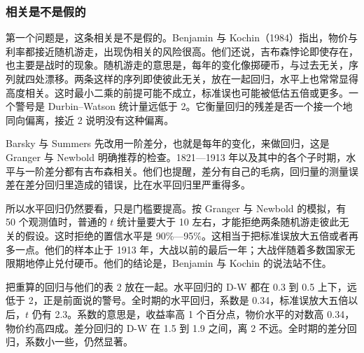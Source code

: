 
\subsubsection{相关是不是假的}
第一个问题是，这条相关是不是假的。Benjamin 与 Kochin（1984）指出，物价与利率都接近随机游走，出现伪相关的风险很高\cite{barsky1985}。他们还说，吉布森悖论即使存在，也主要是战时的现象\cite{barsky1985}。随机游走的意思是，每年的变化像掷硬币，与过去无关，序列就四处漂移。两条这样的序列即使彼此无关，放在一起回归，水平上也常常显得高度相关。这时最小二乘的前提可能不成立，标准误也可能被低估五倍或更多\cite{barsky1985}。一个警号是 Durbin–Watson 统计量远低于 2。它衡量回归的残差是否一个接一个地同向偏离，接近 2 说明没有这种偏离。

Barsky 与 Summers 先改用一阶差分，也就是每年的变化，来做回归，这是 Granger 与 Newbold 明确推荐的检查\cite{barsky1985}。1821—1913 年以及其中的各个子时期，水平与一阶差分都有吉布森相关\cite{barsky1985}。他们也提醒，差分有自己的毛病，回归量的测量误差在差分回归里造成的错误，比在水平回归里严重得多\cite{barsky1985}。

所以水平回归仍然要看，只是门槛要提高。按 Granger 与 Newbold 的模拟，有 50 个观测值时，普通的 $t$ 统计量要大于 10 左右，才能拒绝两条随机游走彼此无关的假设\cite{barsky1985}。这时拒绝的置信水平是 90\%—95\%\cite{barsky1985}。这相当于把标准误放大五倍或者再多一点\cite{barsky1985}。他们的样本止于 1913 年，大战以前的最后一年；大战伴随着多数国家无限期地停止兑付硬币\cite{barsky1985}。他们的结论是，Benjamin 与 Kochin 的说法站不住\cite{barsky1985}。

 把重算的回归与他们的表 2 放在一起。水平回归的 D-W 都在 0.3 到 0.5 上下，远低于 2，正是前面说的警号。全时期的水平回归，系数是 0.34，标准误放大五倍以后，$t$ 仍有 2.3\cite{boe2017}。系数的意思是，收益率高 1 个百分点，物价水平的对数高 0.34，物价约高四成。差分回归的 D-W 在 1.5 到 1.9 之间，离 2 不远。全时期的差分回归，系数小一些，仍然显著。

